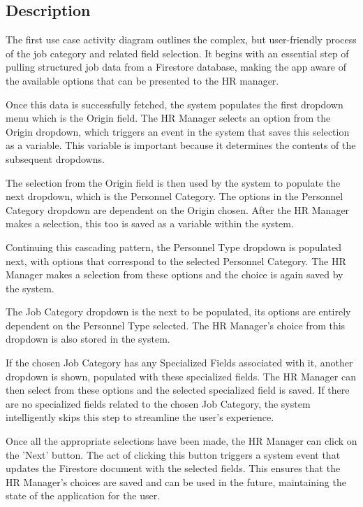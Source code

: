 \subsection*{Description}
The first use case activity diagram outlines the complex, but user-friendly process of the job category and related field selection. It begins with an essential step of pulling structured job data from a Firestore database, making the app aware of the available options that can be presented to the HR manager.

Once this data is successfully fetched, the system populates the first dropdown menu which is the Origin field. The HR Manager selects an option from the Origin dropdown, which triggers an event in the system that saves this selection as a variable. This variable is important because it determines the contents of the subsequent dropdowns.

The selection from the Origin field is then used by the system to populate the next dropdown, which is the Personnel Category. The options in the Personnel Category dropdown are dependent on the Origin chosen. After the HR Manager makes a selection, this too is saved as a variable within the system.

Continuing this cascading pattern, the Personnel Type dropdown is populated next, with options that correspond to the selected Personnel Category. The HR Manager makes a selection from these options and the choice is again saved by the system.

The Job Category dropdown is the next to be populated, its options are entirely dependent on the Personnel Type selected. The HR Manager's choice from this dropdown is also stored in the system.

If the chosen Job Category has any Specialized Fields associated with it, another dropdown is shown, populated with these specialized fields. The HR Manager can then select from these options and the selected specialized field is saved. If there are no specialized fields related to the chosen Job Category, the system intelligently skips this step to streamline the user's experience.

Once all the appropriate selections have been made, the HR Manager can click on the 'Next' button. The act of clicking this button triggers a system event that updates the Firestore document with the selected fields. This ensures that the HR Manager's choices are saved and can be used in the future, maintaining the state of the application for the user.

